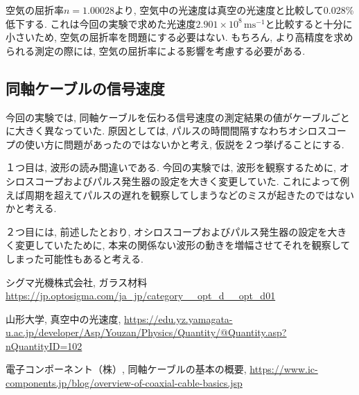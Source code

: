 \documentclass{jarticle}
\begin{document}
空気の屈折率$n=1.00028$より, 空気中の光速度は真空の光速度と比較して0.028\%低下する.
これは今回の実験で求めた光速度$2.901\times10^8\,\mathrm{ms^{-1}}$と比較すると十分に小さいため, 空気の屈折率を問題にする必要はない. もちろん, より高精度を求められる測定の際には, 空気の屈折率による影響を考慮する必要がある.


\subsection{同軸ケーブルの信号速度}

今回の実験では, 同軸ケーブルを伝わる信号速度の測定結果の値がケーブルごとに大きく異なっていた.
原因としては, パルスの時間間隔すなわちオシロスコープの使い方に問題があったのではないかと考え, 仮説を２つ挙げることにする.

１つ目は, 波形の読み間違いである.
今回の実験では, 波形を観察するために, オシロスコープおよびパルス発生器の設定を大きく変更していた.
これによって例えば周期を超えてパルスの遅れを観察してしまうなどのミスが起きたのではないかと考える.

２つ目には, 前述したとおり, オシロスコープおよびパルス発生器の設定を大きく変更していたために, 本来の関係ない波形の動きを増幅させてそれを観察してしまった可能性もあると考える.



\begin{thebibliography}{99}

  シグマ光機株式会社, ガラス材料 \url{https://jp.optosigma.com/ja_jp/category__opt_d__opt_d01}

  山形大学, 真空中の光速度, \url{https://edu.yz.yamagata-u.ac.jp/developer/Asp/Youzan/Physics/Quantity/@Quantity.asp?nQuantityID=102}

  電子コンポーネント（株）, 同軸ケーブルの基本の概要, \url{https://www.ic-components.jp/blog/overview-of-coaxial-cable-basics.jsp}

\end{thebibliography}
\end{document}
